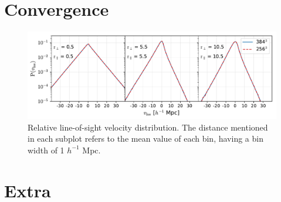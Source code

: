 \documentclass[a4paper,fleqn,usenatbib]{mnras}
\begin{document}
	
	
	
	
	
	
	
	
	\appendix
	
	\section{Convergence}
	\label{app:conv}
	\begin{figure}
		\centering
		\includegraphics[scale=0.77]{rel_los_convergence}
		\caption{Relative line-of-sight velocity distribution. The distance mentioned in each subplot refers to the mean value of each bin, having a bin width of 1 $h^{-1}$ Mpc.}
		\label{fig:conv}
	\end{figure}
	
	\section{Extra}
	\label{app:extra}




\bsp	%
\label{lastpage}
\end{document}
